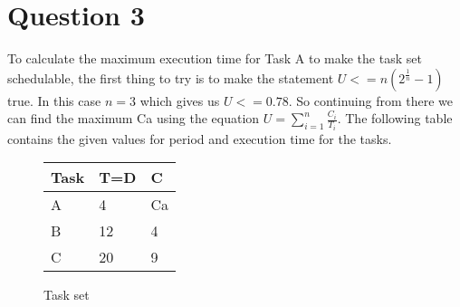 \section{Question 3}

    To calculate the maximum execution time for Task A to make the task set schedulable, the first thing to try is to make the statement $U <= n(2^{\frac{1}{n}} - 1)$ true. In this case $n = 3$ which gives us $U <= 0.78$. So continuing from there we can find the maximum Ca using the equation $U = \sum_{i=1}^{n} \frac{C_i}{T_i}$. The following table contains the given values for period and execution time for the tasks.
    \renewcommand{\arraystretch}{1.4}
        \begin{figure}[H]
        \centering
        \begin{minipage}{0.5\textwidth}
            \begin{table}[H]
            \centering
            \begin{tabular}{|l|l|l|}
                \hline
                \textbf{Task}   & \textbf{T=D}  & \textbf{C}  \\ \hline
                A               & 4             & Ca          \\ \hline
                B               & 12            & 4           \\ \hline
                C               & 20            & 9           \\ \hline

            \end{tabular}
            \end{table}
        \end{minipage}%
        \caption{Task set}
        \label{fig:Q3tasks}
        \end{figure}
    \renewcommand{\arraystretch}{1.0}
